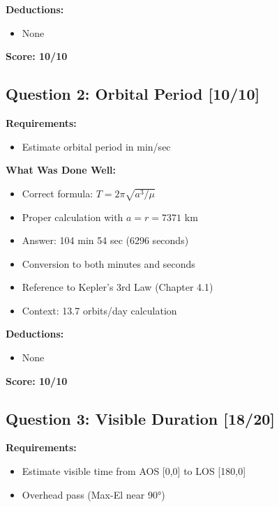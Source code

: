 \documentclass[11pt,letterpaper]{article}
\begin{document}
\textbf{Deductions:}
\begin{itemize}
    \item None
\end{itemize}

\textbf{Score: 10/10}

\subsection{Question 2: Orbital Period [10/10]}

\textbf{Requirements:}
\begin{itemize}
    \item Estimate orbital period in min/sec
\end{itemize}

\textbf{What Was Done Well:}
\begin{itemize}
    \item[\color{green}\checkmark] Correct formula: $T = 2\pi \sqrt{a^3/\mu}$
    \item[\color{green}\checkmark] Proper calculation with $a = r = 7371$ km
    \item[\color{green}\checkmark] Answer: 104 min 54 sec (6296 seconds)
    \item[\color{green}\checkmark] Conversion to both minutes and seconds
    \item[\color{green}\checkmark] Reference to Kepler's 3rd Law (Chapter 4.1)
    \item[\color{green}\checkmark] Context: 13.7 orbits/day calculation
\end{itemize}

\textbf{Deductions:}
\begin{itemize}
    \item None
\end{itemize}

\textbf{Score: 10/10}

\subsection{Question 3: Visible Duration [18/20]}

\textbf{Requirements:}
\begin{itemize}
    \item Estimate visible time from AOS [0,0] to LOS [180,0]
    \item Overhead pass (Max-El near 90°)
\end{itemize}
\end{document}
